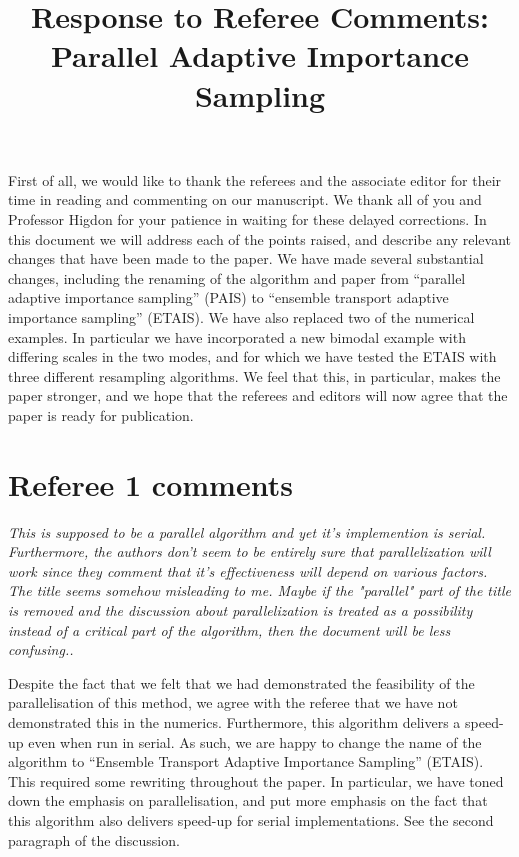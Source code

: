 \documentclass{article}
\newcommand{\comment}[2]{\vspace{0.6cm}{\bf Comment:} {\it #1.}

\vspace{0.3cm}{\bf Answer:} #2}
\begin{document}
\title{Response to Referee Comments: Parallel Adaptive Importance Sampling}
\maketitle
First of all, we would like to thank the referees and the associate editor for
their time in reading and commenting on our manuscript. We thank all of you and Professor Higdon for your patience in waiting for these delayed corrections. In this document
we will address each of the points raised, and describe any relevant
changes that have been made to the paper. We have made several substantial changes, including the renaming of the algorithm and paper from ``parallel adaptive importance sampling'' (PAIS) to ``ensemble transport adaptive importance sampling'' (ETAIS). We have also replaced two of the numerical examples. In particular we have incorporated a new bimodal example with differing scales in the two modes, and for which we have tested the ETAIS with three different resampling algorithms. We feel that this, in particular, makes the paper stronger, and we hope that the referees and editors will now agree that the paper is ready for publication.

\section*{Referee 1 comments}

\comment{This is supposed to be a parallel algorithm and yet it's implemention is serial. Furthermore, the authors don't seem to be entirely sure that parallelization will work since they comment that it's effectiveness will depend on various factors. The title seems somehow misleading to me. Maybe if the "parallel" part of the title is removed and the discussion about parallelization is treated as a possibility instead of a critical part of the algorithm, then the document will be less confusing.}{Despite the fact that we felt that we had demonstrated the feasibility of the parallelisation of this method, we agree with the referee that we have not demonstrated this in the numerics. Furthermore, this algorithm delivers a speed-up even when run in serial. As such, we are happy to change the name of the algorithm to ``Ensemble Transport Adaptive Importance Sampling'' (ETAIS). This required some rewriting throughout the paper. In particular, we have toned down the emphasis on parallelisation, and put more emphasis on the fact that this algorithm also delivers speed-up for serial implementations. See the second paragraph of the discussion.}
\end{document}
